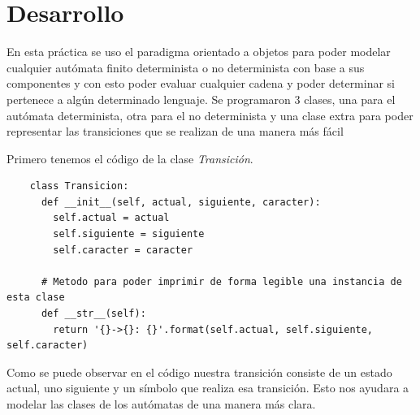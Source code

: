 \documentclass[titlepage]{article}
\begin{document}
	\section{Desarrollo}
	En esta práctica se uso el paradigma orientado a objetos para poder modelar cualquier autómata finito determinista 
	o no determinista con base a sus componentes y con esto poder evaluar cualquier cadena y poder determinar 
	si pertenece a algún determinado lenguaje. Se programaron 3 clases, una para el autómata determinista, otra para el no determinista y una clase extra para poder
	representar las transiciones que se realizan de una manera más fácil
	
	Primero tenemos el código de la clase \emph{Transición}.
	\begin{lstlisting}
	class Transicion:
	  def __init__(self, actual, siguiente, caracter):
	    self.actual = actual
	    self.siguiente = siguiente
	    self.caracter = caracter
	    
	  # Metodo para poder imprimir de forma legible una instancia de esta clase
	  def __str__(self):
	    return '{}->{}: {}'.format(self.actual, self.siguiente, self.caracter)
	\end{lstlisting}
	Como se puede observar en el código nuestra transición consiste de un estado actual, uno siguiente y un símbolo que realiza esa transición.
	Esto nos ayudara a modelar las clases de los autómatas de una manera más clara.
	
\end{document}
